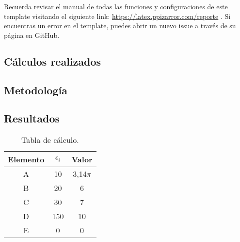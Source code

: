 	Recuerda revisar el manual de todas las funciones y configuraciones de este template visitando el siguiente link: \url{https://latex.ppizarror.com/reporte} \cite{template}. Si encuentras un error en el template, puedes abrir un nuevo issue a través de su página en GitHub.





\begin{appendixd}

	\section{Cálculos realizados}

	\subsection{Metodología}
	\lipsum[1-2]


	\subsection{Resultados}
	\lipsum[10]

	\enabletablerowcolor[2] %
	\begin{table}[H]
		\centering
		\caption{Tabla de cálculo.}
		\begin{tabular}{ccc}
			\hline
			\textbf{Elemento} & $\epsilon_i$ & \textbf{Valor} \bigstrut\\
			\hline
			A     & 10    & 3,14$\pi$ \\
			B     & 20    & 6 \\
			C     & 30    & 7 \\
			D     & 150    & 10 \\
			E     & 0    & 0 \\
			\hline
			\end{tabular}
		\label{tab:anexo-1}
	\end{table}
	\disabletablerowcolor %


\end{appendixd}
